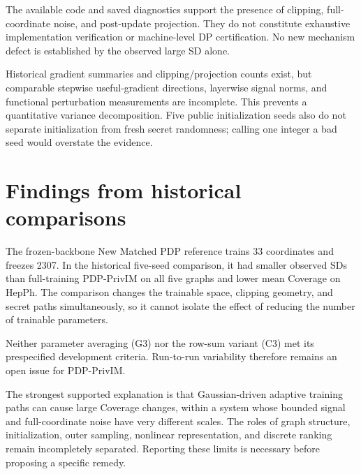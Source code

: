 The available code and saved diagnostics support the presence of clipping, full-coordinate noise, and post-update projection. They do not constitute exhaustive implementation verification or machine-level DP certification. No new mechanism defect is established by the observed large SD alone.

Historical gradient summaries and clipping/projection counts exist, but comparable stepwise useful-gradient directions, layerwise signal norms, and functional perturbation measurements are incomplete. This prevents a quantitative variance decomposition. Five public initialization seeds also do not separate initialization from fresh secret randomness; calling one integer a bad seed would overstate the evidence.

\section{Findings from historical comparisons}
The frozen-backbone New Matched PDP reference trains 33 coordinates and freezes 2307. In the historical five-seed comparison, it had smaller observed SDs than full-training PDP-PrivIM on all five graphs and lower mean Coverage on HepPh. The comparison changes the trainable space, clipping geometry, and secret paths simultaneously, so it cannot isolate the effect of reducing the number of trainable parameters.

Neither parameter averaging (G3) nor the row-sum variant (C3) met its prespecified development criteria. Run-to-run variability therefore remains an open issue for PDP-PrivIM.

The strongest supported explanation is that Gaussian-driven adaptive training paths can cause large Coverage changes, within a system whose bounded signal and full-coordinate noise have very different scales. The roles of graph structure, initialization, outer sampling, nonlinear representation, and discrete ranking remain incompletely separated. Reporting these limits is necessary before proposing a specific remedy.
